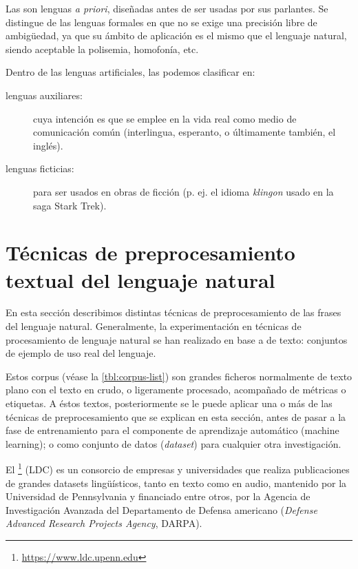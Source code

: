 Las  son lenguas \emph{a priori}, diseñadas antes de ser usadas por sus parlantes. Se distingue de las lenguas formales en que no se exige una precisión libre de ambigüedad, ya que su ámbito de aplicación es el mismo que el lenguaje natural, siendo aceptable la polisemia, homofonía, etc.

Dentro de las lenguas artificiales, las podemos clasificar en:
\nopagebreak
\begin{description}
\item[lenguas auxiliares:] cuya intención es que se emplee en la vida real como medio de comunicación común (interlingua, esperanto, o últimamente también, el inglés).
\item[lenguas ficticias:] para ser usados en obras de ficción (p. ej. el idioma \emph{klingon} usado en la saga Stark Trek).
\end{description}


\section{Técnicas de preprocesamiento textual del lenguaje natural}

En esta sección describimos distintas técnicas de preprocesamiento de las frases del lenguaje natural. Generalmente, la experimentación en técnicas de procesamiento de lenguaje natural se han realizado en base a  de texto: conjuntos de ejemplo de uso real del lenguaje.

Estos corpus (véase la \autoref{tbl:corpus-list}) son grandes ficheros normalmente de texto plano con el texto en crudo, o ligeramente procesado, acompañado de métricas o etiquetas. A éstos textos, posteriormente se le puede aplicar una o más de las técnicas de preprocesamiento que se explican en esta sección, antes de pasar a la fase de entrenamiento para el componente de aprendizaje automático (machine learning); o como conjunto de datos (\emph{dataset}) para cualquier otra investigación.

El \footnote{\url{https://www.ldc.upenn.edu}} (LDC) es un consorcio de empresas y universidades que realiza publicaciones de grandes datasets lingüísticos, tanto en texto como en audio, mantenido por la Universidad de Pennsylvania y financiado entre otros, por la Agencia de Investigación Avanzada del Departamento de Defensa americano (\emph{Defense Advanced Research Projects Agency}, DARPA).

